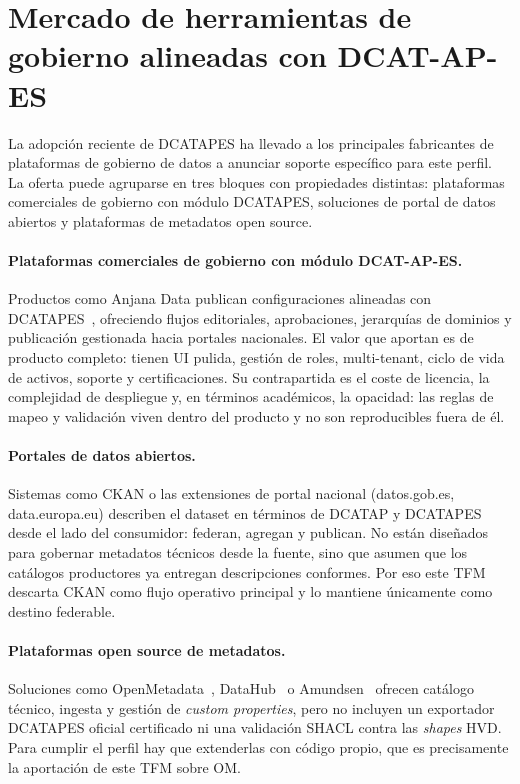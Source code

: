 \section{Mercado de herramientas de gobierno alineadas con DCAT-AP-ES}\label{sec:mercado-dcatapes}

La adopción reciente de \ac{DCATAPES} ha llevado a los principales fabricantes de plataformas de gobierno de datos a anunciar soporte específico para este perfil. La oferta puede agruparse en tres bloques con propiedades distintas: plataformas comerciales de gobierno con módulo \ac{DCATAPES}, soluciones de portal de datos abiertos y plataformas de metadatos open source.

\paragraph{Plataformas comerciales de gobierno con módulo DCAT-AP-ES.} Productos como Anjana Data publican configuraciones alineadas con \ac{DCATAPES}~\cite{anjanaDcatApEs2026}, ofreciendo flujos editoriales, aprobaciones, jerarquías de dominios y publicación gestionada hacia portales nacionales. El valor que aportan es de producto completo: tienen \ac{UI} pulida, gestión de roles, multi-tenant, ciclo de vida de activos, soporte y certificaciones. Su contrapartida es el coste de licencia, la complejidad de despliegue y, en términos académicos, la opacidad: las reglas de mapeo y validación viven dentro del producto y no son reproducibles fuera de él.

\paragraph{Portales de datos abiertos.} Sistemas como CKAN o las extensiones de portal nacional (datos.gob.es, data.europa.eu) describen el dataset en términos de \ac{DCATAP} y \ac{DCATAPES} desde el lado del consumidor: federan, agregan y publican. No están diseñados para gobernar metadatos técnicos desde la fuente, sino que asumen que los catálogos productores ya entregan descripciones conformes. Por eso este TFM descarta CKAN como flujo operativo principal y lo mantiene únicamente como destino federable.

\paragraph{Plataformas open source de metadatos.} Soluciones como OpenMetadata~\cite{openmetadataDocs}, DataHub~\cite{datahubDocs} o Amundsen~\cite{amundsenDocs} ofrecen catálogo técnico, ingesta y gestión de \emph{custom properties}, pero no incluyen un exportador \ac{DCATAPES} oficial certificado ni una validación \ac{SHACL} contra las \emph{shapes} \ac{HVD}. Para cumplir el perfil hay que extenderlas con código propio, que es precisamente la aportación de este TFM sobre \ac{OM}.

